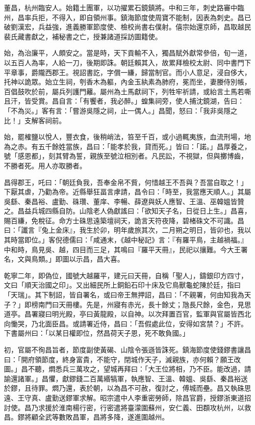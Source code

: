 \begin{pinyinscope}
 董昌，杭州臨安人。始籍土團軍，以功擢累石鏡鎮將。中和三年，刺史路審中臨州，昌率兵拒，不得入，即自領州事。鎮海節度使周寶不能制，因表為刺史。昌已破劉漢宏，兵益強，進義勝軍節度使、檢校尚書右僕射。僖宗始還京師，昌取越民裴氏藏書獻之，補秘書之亡，授兼諸道採訪圖籍使。



 始，為治廉平，人頗安之。當是時，天下貢輸不入，獨昌賦外獻常參倍，旬一道，以五百人為率，人給一刀，後期即誅。朝廷賴其入，故累拜檢校太尉、同中書門下平章事，爵隴西郡王。視詔書訖，字償一縑，歸當制官。而小人意足，浸自侈大，托神以詭眾。始立生祠，刳香木為軀，內金玉紈素為肺府，冕而坐，妻媵侍別帳，百倡鼓吹於前，屬兵列護門䍦。屬州為土馬獻祠下，列牲牢祈請，或紿言土馬若嘶且汗，皆受賞。昌自言：「有饗者，我必醉。」蝗集祠旁，使人捕沈鏡湖，告曰：「不為災。」客有言：「嘗游吳隱之祠，止一偶人。」昌聞，怒曰：「我非吳隱之比！」支解客祠前。



 始，罷榷鹽以悅人，豐衣食，後稍峭法，笞至千百，或小過輒夷族，血流刑場，地為之赤。有五千餘姓當族，昌曰：「能孝於我，貸而死。」皆曰：「諾。」昌厚養之，號「感恩都」，刻其臂為誓，親族至號泣相別者。凡民訟，不視獄，但與擲博齒，不勝者死。用人亦取勝者。



 昌得郡王，吒曰：「朝廷負我，吾奉金帛不貲，何惜越王不吾與？吾當自取之！」下厭其虐，乃勸為帝。近縣舉狂畐言虖請，昌令曰：「時至，我當應天順人。」其屬吳繇、秦昌裕、盧勤、硃瓚、董庠、李暢、薛遼與妖人應智、王溫、巫韓媼皆贊之。昌益兵城四縣自防。山陰老人偽獻謠曰：「欲知天子名，日從日上生。」昌喜，賜百縑，免稅征。命方士硃思遠築壇祠天，詭言天符夜降，碧楮硃文不可識。昌曰：「讖言『兔上金床』，我生於卯，明年歲旅其次，二月朔之明日，皆卯也，我以其時當即位。」客倪德儒曰：「咸通末，《越中秘記》言：『有羅平鳥，主越禍福。』中和時，鳥見吳、越，四目而三足，其鳴曰『羅平天冊』，民祀以攘難。今大王署名，文與鳥類。」即圖以示昌，昌大喜。



 乾寧二年，即偽位，國號大越羅平，建元曰天冊，自稱「聖人」，鑄銀印方四寸，文曰「順天治國之印」。又出細民所上銅鉛石印十床及它鳥獸龜蛇陳於廷，指曰「天瑞」。其下制詔，皆自署名，或曰帝王無押詔，昌曰：「不親署，何由知我為天子？」即榜南門曰天冊樓。先是，州寢有赤光，長十餘丈；虺長尺餘，金色，見思道亭。昌署寢曰明光殿，亭曰黃龍殿，以自神。以次拜置百官，監軍與官屬皆西北向慟哭，乃北面臣昌。或請署近侍，昌曰：「吾假處此位，安得如宮禁？」不許。下書屬州曰：「以某日權即位，然昌荷天子恩，死不敢負國。」



 初，官屬不徇昌旨者，節度副使黃碣、山陰令張遜皆誅死。鎮海節度使錢鏐書讓昌曰：「開府領節度，終身富貴，不能守，閉城作天子，滅親族，亦何賴？願王改圖。」昌不聽，燜悉兵三萬攻之，望城再拜曰：「大王位將相，乃不臣。能改過，請諭還諸軍。」昌懼，獻鏐錢二百萬緡犒軍，執應智、王溫、韓媼、吳繇、秦昌裕送於鏐，且待罪。燜乃還，表於朝，以為昌不可赦，復討之，傅城而壘。昌又執硃思遠、王守真、盧勤送鏐軍求解。昭宗遣中人李重密勞師，除昌官爵，授鏐浙東道招討使。昌乃求援於淮南楊行密，行密遣將臺濛圍蘇州，安仁義、田頵攻杭州，以救昌。鏐將顧全武等數敗昌軍，昌將多降，遂進圍越州。




\end{pinyinscope}
